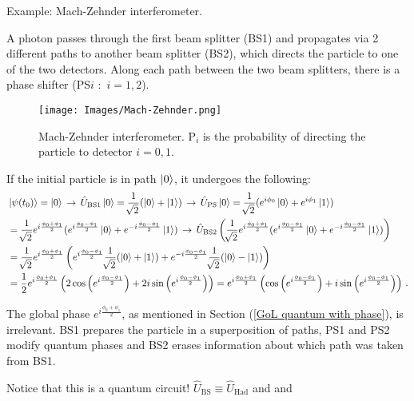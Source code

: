 \documentclass[11pt]{article}
\numberwithin{equation}{section} %
\numberwithin{figure}{section} %
\begin{document}
\begin{appendices}
Example: Mach-Zehnder interferometer.

A photon passes through the first beam splitter (BS1) and propagates via 2 different paths to another beam splitter (BS2), which directs the particle to one of the two detectors. Along each path between the two beam splitters, there is a phase shifter (PS$i$ $:$ $i=1,2$).

\begin{figure}[H] 
	\centering
	\texttt{[image: Images/Mach-Zehnder.png]}
	\caption{Mach-Zehnder interferometer. P$_i$ is the probability of directing the particle to detector $i=0,1$.}
	  \label{fig:Mach-Zehnder}
\end{figure}

If the initial particle is in path $\ket{0}$, it undergoes the following:
\begin{equation}
\begin{split}
&\ket{\psi(t_0)}=\ket{0}\,\to\,\hat{U}_{\textrm{BS1}}\ket{0}=\frac{1}{\sqrt[]{2}}(\ket{0}+\ket{1})\,\to\,\hat{U}_{\textrm{PS}}\ket{0}=\frac{1}{\sqrt[]{2}}(e^{i\phi_0}\ket{0}+e^{i\phi_1}\ket{1})\\
&=\frac{1}{\sqrt[]{2}}e^{i\frac{\phi_0+\phi_1}{2}}(e^{i\frac{\phi_0-\phi_1}{2}}\ket{0}+e^{-i\frac{\phi_0-\phi_1}{2}}\ket{1})\, \to \, \hat{U}_{\textrm{BS2}}\left( \frac{1}{\sqrt[]{2}}e^{i\frac{\phi_0+\phi_1}{2}}(e^{i\frac{\phi_0-\phi_1}{2}}\ket{0}+e^{-i\frac{\phi_0-\phi_1}{2}}\ket{1}) \right)\\
& = \frac{1}{\sqrt[]{2}}e^{i\frac{\phi_0+\phi_1}{2}} \left( e^{i\frac{\phi_0-\phi_1}{2}}\frac{1}{\sqrt[]{2}}(\ket{0}+\ket{1})+e^{-i\frac{\phi_0-\phi_1}{2}}\frac{1}{\sqrt[]{2}}(\ket{0}-\ket{1}) \right)\\
&= \frac{1}{2}  e^{i\frac{\phi_0+\phi_1}{2}} \left( 2\cos\left( e^{i\frac{\phi_0-\phi_1}{2}} \right) +  2i\sin\left( e^{i\frac{\phi_0-\phi_1}{2}} \right) \right) =  e^{i\frac{\phi_0+\phi_1}{2}} \left( \cos\left( e^{i\frac{\phi_0-\phi_1}{2}} \right) +  i\sin\left( e^{i\frac{\phi_0-\phi_1}{2}} \right) \right)\,\textrm{.}
\end{split}
\end{equation}

The global phase $e^{i\frac{\phi_0+\phi_1}{2}}$, as mentioned in Section (\ref{GoL quantum with phase}), is irrelevant. BS1 prepares the particle in a superposition of paths, PS1 and PS2 modify quantum phases and BS2 erases information about which path was taken from BS1.

Notice that this is a quantum circuit! $\hat{U}_{\textrm{BS}}\equiv\hat{U}_{\textrm{Had}}$ and and %








\end{appendices}
\end{document}
